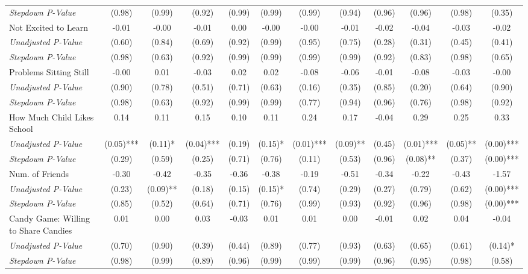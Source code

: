 \begin{tabular}{l c c c c c c c c c c c}
\quad \textit{Stepdown P-Value} & (0.98) & (0.99) & (0.92) & (0.99) & (0.99) & (0.99) & (0.94) & (0.96) & (0.96) & (0.98) & (0.35) \\
Not Excited to Learn & -0.01 & -0.00 & -0.01 & 0.00 & -0.00 & -0.00 & -0.01 & -0.02 & -0.04 & -0.03 & -0.02 \\
\quad \textit{Unadjusted P-Value} & (0.60) & (0.84) & (0.69) & (0.92) & (0.99) & (0.95) & (0.75) & (0.28) & (0.31) & (0.45) & (0.41) \\
\quad \textit{Stepdown P-Value} & (0.98) & (0.63) & (0.92) & (0.99) & (0.99) & (0.99) & (0.99) & (0.92) & (0.83) & (0.98) & (0.65) \\
Problems Sitting Still & -0.00 & 0.01 & -0.03 & 0.02 & 0.02 & -0.08 & -0.06 & -0.01 & -0.08 & -0.03 & -0.00 \\
\quad \textit{Unadjusted P-Value} & (0.90) & (0.78) & (0.51) & (0.71) & (0.63) & (0.16) & (0.35) & (0.85) & (0.20) & (0.64) & (0.90) \\
\quad \textit{Stepdown P-Value} & (0.98) & (0.63) & (0.92) & (0.99) & (0.99) & (0.77) & (0.94) & (0.96) & (0.76) & (0.98) & (0.92) \\
How Much Child Likes School & 0.14 & 0.11 & 0.15 & 0.10 & 0.11 & 0.24 & 0.17 & -0.04 & 0.29 & 0.25 & 0.33 \\
\quad \textit{Unadjusted P-Value} & (0.05)*** & (0.11)* & (0.04)*** & (0.19) & (0.15)* & (0.01)*** & (0.09)** & (0.45) & (0.01)*** & (0.05)** & (0.00)*** \\
\quad \textit{Stepdown P-Value} & (0.29) & (0.59) & (0.25) & (0.71) & (0.76) & (0.11) & (0.53) & (0.96) & (0.08)** & (0.37) & (0.00)*** \\
Num. of Friends & -0.30 & -0.42 & -0.35 & -0.36 & -0.38 & -0.19 & -0.51 & -0.34 & -0.22 & -0.43 & -1.57 \\
\quad \textit{Unadjusted P-Value} & (0.23) & (0.09)** & (0.18) & (0.15) & (0.15)* & (0.74) & (0.29) & (0.27) & (0.79) & (0.62) & (0.00)*** \\
\quad \textit{Stepdown P-Value} & (0.85) & (0.52) & (0.64) & (0.71) & (0.76) & (0.99) & (0.93) & (0.92) & (0.96) & (0.98) & (0.00)*** \\
Candy Game: Willing to Share Candies & 0.01 & 0.00 & 0.03 & -0.03 & 0.01 & 0.01 & 0.00 & -0.01 & 0.02 & 0.04 & -0.04 \\
\quad \textit{Unadjusted P-Value} & (0.70) & (0.90) & (0.39) & (0.44) & (0.89) & (0.77) & (0.93) & (0.63) & (0.65) & (0.61) & (0.14)* \\
\quad \textit{Stepdown P-Value} & (0.98) & (0.99) & (0.89) & (0.96) & (0.99) & (0.99) & (0.99) & (0.96) & (0.95) & (0.98) & (0.58) \\
\bottomrule
\end{tabular}
